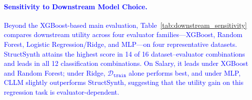 \paragraph{\textcolor{blue}{Sensitivity to Downstream Model Choice.}}
\textcolor{blue}{Beyond the XGBoost-based main evaluation, Table~\ref{tab:downstream_sensitivity} compares downstream utility across four evaluator families---XGBoost, Random Forest, Logistic Regression/Ridge, and MLP---on four representative datasets. \textsf{StructSynth} attains the highest score in 14 of 16 dataset--evaluator combinations and leads in all 12 classification combinations. On Salary, it leads under XGBoost and Random Forest; under Ridge, $\mathcal{D}_\mathtt{train}$ alone performs best, and under MLP, CLLM slightly outperforms \textsf{StructSynth}, suggesting that the utility gain on this regression task is evaluator-dependent.}

